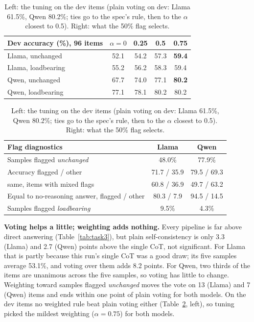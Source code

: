 \documentclass[11pt,a4paper]{article}
\begin{document}
\begin{table}[h]
\centering\small
\begin{tabular}{@{}lcccc@{}}
\toprule
Dev accuracy (\%), 96 items & $\alpha=0$ & 0.25 & 0.5 & 0.75 \\
\midrule
Llama, unchanged & 52.1 & 54.2 & 57.3 & \textbf{59.4} \\
Llama, loadbearing & 55.2 & 56.2 & 58.3 & 59.4 \\
Qwen, unchanged & 67.7 & 74.0 & 77.1 & \textbf{80.2} \\
Qwen, loadbearing & 77.1 & 78.1 & 80.2 & 80.2 \\
\bottomrule
\end{tabular}
\quad
\begin{tabular}{@{}lcc@{}}
\toprule
Flag diagnostics & Llama & Qwen \\
\midrule
Samples flagged \emph{unchanged} & 48.0\% & 77.9\% \\
Accuracy flagged / other & 71.7 / 35.9 & 79.5 / 69.3 \\
\quad same, items with mixed flags & 60.8 / 36.9 & 49.7 / 63.2 \\
Equal to no-reasoning answer, flagged / other & 80.3 / 7.9 & 94.5 / 14.5 \\
Samples flagged \emph{loadbearing} & 9.5\% & 4.3\% \\
\bottomrule
\end{tabular}
\caption{Left: the tuning on the dev items (plain voting on dev: Llama 61.5\%, Qwen 80.2\%; ties go to the spec's rule, then to
the $\alpha$ closest to 0.5). Right: what the 50\% flag selects.}
\label{tab:flags}
\end{table}

\noindent\textbf{Voting helps a little; weighting adds nothing.} Every pipeline is far above direct answering
(Table~\ref{tab:task3}), but plain self-consistency is only 3.3 (Llama) and 2.7 (Qwen) points above the single CoT, not
significant. For Llama that is partly because this run's single CoT was a good draw; its five samples average 53.1\%, and
voting over them adds 8.2 points. For Qwen, two thirds of the items are unanimous across the five samples, so voting has
little to change. Weighting toward samples flagged \emph{unchanged} moves the vote on 13 (Llama) and 7 (Qwen) items and ends
within one point of plain voting for both models. On the dev items no weighted rule beat plain voting either
(Table~\ref{tab:flags}, left), so tuning picked the mildest weighting ($\alpha=0.75$) for both models.
\end{document}
